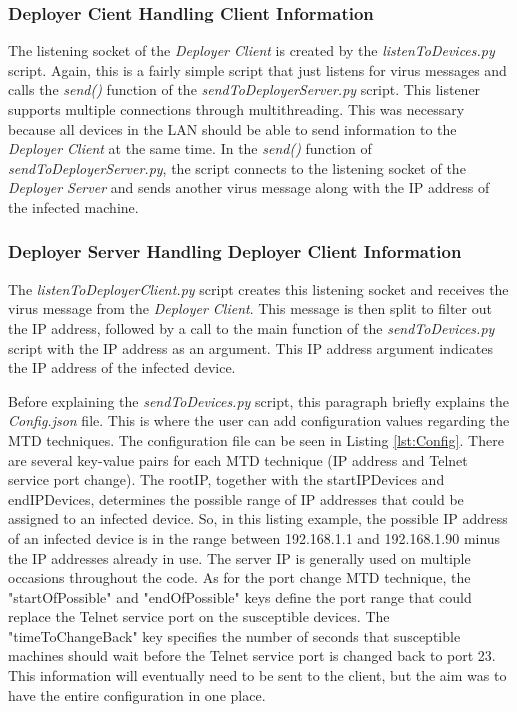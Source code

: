 \subsubsection{Deployer Cient Handling Client Information}
The listening socket of the \textit{Deployer Client} is created by the \textit{listenToDevices.py} script. Again, this is a fairly simple script that just listens for virus messages and calls the \textit{send()} function of the \textit{sendToDeployerServer.py} script. This listener supports multiple connections through multithreading. This was necessary because all devices in the LAN should be able to send information to the \textit{Deployer Client} at the same time. In the \textit{send()} function of \textit{sendToDeployerServer.py}, the script connects to the listening socket of the \textit{Deployer Server} and sends another virus message along with the IP address of the infected machine.




\subsubsection{Deployer Server Handling Deployer Client Information}
The \textit{listenToDeployerClient.py} script creates this listening socket and receives the virus message from the \textit{Deployer Client}. This message is then split to filter out the IP address, followed by a call to the main function of the \textit{sendToDevices.py} script with the IP address as an argument. This IP address argument indicates the IP address of the infected device. 

Before explaining the \textit{sendToDevices.py} script, this paragraph briefly explains the \textit{Config.json} file. This is where the user can add configuration values regarding the MTD techniques. The configuration file can be seen in Listing \ref{lst:Config}. There are several key-value pairs for each MTD technique (IP address and Telnet service port change). The rootIP, together with the startIPDevices and endIPDevices, determines the possible range of IP addresses that could be assigned to an infected device. So, in this listing example, the possible IP address of an infected device is in the range between 192.168.1.1 and 192.168.1.90 minus the IP addresses already in use. The server IP is generally used on multiple occasions throughout the code. As for the port change MTD technique, the "startOfPossible" and "endOfPossible" keys define the port range that could replace the Telnet service port on the susceptible devices. The "timeToChangeBack" key specifies the number of seconds that susceptible machines should wait before the Telnet service port is changed back to port 23. This information will eventually need to be sent to the client, but the aim was to have the entire configuration in one place.

